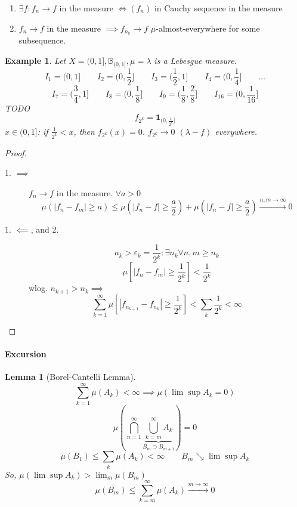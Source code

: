 \documentclass[a4paper]{article}
\newcounter{lecref}[section]
\numberwithin{lecref}{section}
\theoremstyle{break}
\newtheorem{example}[lecref]{Example}
\newtheorem{lemma}[lecref]{Lemma}
\newcommand{\Abs}[1]{\left|#1\right|}
\begin{document}
\begin{theorem}
  \begin{enumerate}
    \item $\exists f: f_n \to f$ in the measure $\iff (f_n)$ in Cauchy sequence in the measure
    \item $f_n \to f$ in the measure $\implies f_{n_k} \to f$ $\mu$-almost-everywhere for some subsequence.
  \end{enumerate}
\end{theorem}

\begin{example}
  Let $X = (0,1], \mathbb B_{(0, 1]}, \mu = \lambda$ is a Lebesgue measure.
  \[ I_1 = (0, 1] \qquad I_2 = (0, \frac12] \qquad I_3 = (\frac12, 1] \qquad I_4 = (0, \frac14] \qquad \dots \]
  \[ I_7 = (\frac34, 1] \qquad I_8 = (0, \frac18] \qquad I_9 = (\frac18, \frac28] \qquad I_{16} = (0, \frac1{16}] \]
  TODO
  \[ f_{2^k} = \mathbf 1_{(0, \frac{1}{2^k}]} \]
  $x \in (0, 1]$: if $\frac{1}{2^k} < x$, then $f_{2^k}(x) = 0$.
  $f_{2^k} \to 0$ $(\lambda-f)$ everywhere.
\end{example}

\begin{proof}
  \begin{description}
    \item[1. $\implies$]
      $f_n \to f$ in the measure. $\forall a > 0$
      \[ \mu\left(\Abs{f_n - f_m} \geq a\right) \leq \mu\left(\Abs{f_n - f} \geq \frac a2\right) + \mu\left(\Abs{f_n - f} \geq \frac a2\right) \xrightarrow{n,m \to \infty} 0 \]
    \item[1. $\impliedby$, and 2.]
      \[ a_k > \varepsilon_k = \frac1{2^k}: \exists n_k \forall n, m \geq n_k \]
      \[ \mu\left[\Abs{f_n - f_m} \geq \frac{1}{2^k}\right] < \frac{1}{2^k} \]
      wlog. $n_{k+1} > n_k \implies$
      \[ \sum_{k=1}^\infty \mu\left[\Abs{f_{n_{k+1}} - f_{n_k}} \geq \frac{1}{2^k}\right] < \sum_k \frac{1}{2^k} < \infty \]
  \end{description}
\end{proof}

\paragraph{Excursion}

\begin{lemma}[Borel-Cantelli Lemma]
  \[ \sum_{k=1}^\infty \mu(A_k) < \infty \implies \mu\left(\lim\sup{A_k} = 0\right) \]
  \[ \mu\left(\bigcap_{n=1}^{\infty} \underbrace{\bigcup_{k=m}^{\infty} A_k}_{B_m \supset B_{m+1}} \right) = 0 \]
  \[ \mu(B_1) \leq \sum_{k} \mu(A_k) < \infty \qquad B_m \searrow \lim\sup A_k \]
  So, $\mu(\lim\sup{A_k}) > \lim_m \mu(B_m)$
  \[ \mu(B_m) \leq \sum_{k=m}^{\infty} \mu(A_k) \xrightarrow{m \to \infty} 0 \]
\end{lemma}
\end{document}
